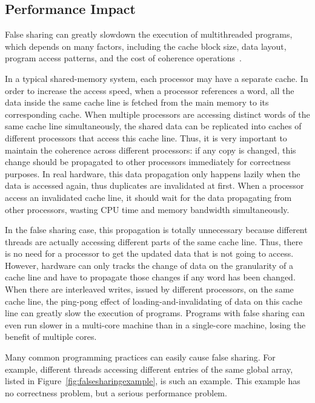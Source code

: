 \subsection{Performance Impact}
\label{falsesharing}
False sharing can greatly slowdown the execution of multithreaded programs, which depends on many factors, including the cache block size, data layout, program access patterns, and the cost of coherence operations~\cite{Bolosky:1993:FSE:1295480.1295483}. 

In a typical shared-memory system, each processor may have a separate cache. In order to increase the access speed, when a processor references a word, all the data inside the same cache line is fetched from the main memory to its corresponding cache. 
When multiple processors are accessing distinct words of the same cache line simultaneously, the shared data can be replicated into caches of different processors that access this cache line. Thus, it is very important to maintain the coherence across different processors: if any copy is changed, this change should be propagated to other processors immediately for correctness purposes. In real hardware, this data propagation only happens lazily when the data is accessed again, thus duplicates are invalidated at first. When a processor access an invalidated cache line, it should wait for the data propagating from other processors, wasting CPU time and memory bandwidth simultaneously. 

In the false sharing case, this propagation is totally unnecessary because different threads are actually accessing different parts of the same cache line. Thus, there is no need for a processor to get the updated data that is not going to access. However, hardware can only tracks the change of data on the granularity of a cache line and have to propagate those changes if any word has been changed. When there are interleaved writes, issued by different processors, on the same cache line, the ping-pong effect of loading-and-invalidating of data on this cache line can greatly slow the execution of programs. 
Programs with false sharing can even run slower in a multi-core machine than in a single-core machine, losing the benefit of multiple cores.  

Many common programming practices can easily cause false sharing. For example, different threads accessing different entries of the same global array, listed in Figure~\ref{fig:falsesharingexample}, is such an example. This example has no correctness problem, but a serious performance problem. 

